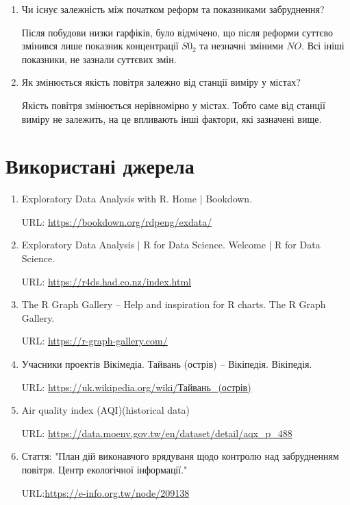 \documentclass{article}
\begin{document}
\begin{enumerate}
    \item Чи існує залежність між початком реформ та показниками забруднення?
    
    Після побудови низки гарфіків, було відмічено, що після реформи суттєво змінився 
    лише показник концентрації $S0_2$ та незначні зміними $NO$. Всі ініші показники, не зазнали суттєвих змін.
    
    \item Як змінюється якість повітря залежно від станції виміру у містах?
    
    Якість повітря змінюється нерівномірно у містах. Тобто саме від станції виміру не залежить, 
    на це впливають інші фактори, які зазначені вище.

\end{enumerate}


\newpage
\section{Використані джерела}
\begin{enumerate}
    \item Exploratory Data Analysis with R. Home | Bookdown. 
    
    URL:  \href{https://bookdown.org/rdpeng/exdata/}{https://bookdown.org/rdpeng/exdata/}
    
    \item Exploratory Data Analysis | R for Data Science. Welcome | R for Data Science.
    
    URL: \href{https://r4ds.had.co.nz/index.html}{https://r4ds.had.co.nz/index.html}
    \item The R Graph Gallery – Help and inspiration for R charts. The R Graph Gallery. 
    
    URL: \href{ https://r-graph-gallery.com/}{ https://r-graph-gallery.com/ }

    \item Учасники проектів Вікімедіа. Тайвань (острів) – Вікіпедія. Вікіпедія.
     
    URL: \href{https://uk.wikipedia.org/wiki/Тайвань\_(острів)}{\url{https://uk.wikipedia.org/wiki/Тайвань_(острів)}} 

    \item Air quality index (AQI)(historical data) 
    
    URL: \href{https://data.moenv.gov.tw/en/dataset/detail/aqx\_p\_488}{\url{https://data.moenv.gov.tw/en/dataset/detail/aqx_p_488}}

    \item Стаття: "План дій виконавчого врядуваня щодо контролю над забрудненням повітря. Центр екологічної інформації."
    
    URL:\href{https://e-info.org.tw/node/209138}{https://e-info.org.tw/node/209138} 

\end{enumerate}
\end{document}
